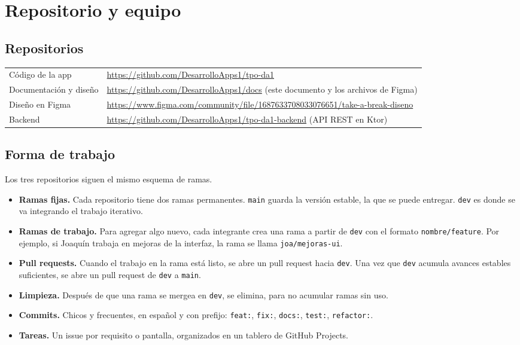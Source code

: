 \section{Repositorio y equipo}
\label{sec:equipo}

\subsection{Repositorios}

\begin{table}[H]
\centering\small
\begin{tabularx}{\textwidth}{@{}l L@{}}
\toprule
Código de la app & \url{https://github.com/DesarrolloApps1/tpo-da1} \\
Documentación y diseño & \url{https://github.com/DesarrolloApps1/docs} (este documento y los archivos de Figma) \\
Diseño en Figma & \url{https://www.figma.com/community/file/1687633708033076651/take-a-break-diseno} \\
Backend & \url{https://github.com/DesarrolloApps1/tpo-da1-backend} (API REST en Ktor) \\
\bottomrule
\end{tabularx}
\end{table}

\subsection{Forma de trabajo}

Los tres repositorios siguen el mismo esquema de ramas.

\begin{itemize}
\item \textbf{Ramas fijas.} Cada repositorio tiene dos ramas permanentes. \texttt{main} guarda la versión estable, la que se puede entregar. \texttt{dev} es donde se va integrando el trabajo iterativo.
\item \textbf{Ramas de trabajo.} Para agregar algo nuevo, cada integrante crea una rama a partir de \texttt{dev} con el formato \texttt{nombre/feature}. Por ejemplo, si Joaquín trabaja en mejoras de la interfaz, la rama se llama \texttt{joa/mejoras-ui}.
\item \textbf{Pull requests.} Cuando el trabajo en la rama está listo, se abre un pull request hacia \texttt{dev}. Una vez que \texttt{dev} acumula avances estables suficientes, se abre un pull request de \texttt{dev} a \texttt{main}.
\item \textbf{Limpieza.} Después de que una rama se mergea en \texttt{dev}, se elimina, para no acumular ramas sin uso.
\item \textbf{Commits.} Chicos y frecuentes, en español y con prefijo: \texttt{feat:}, \texttt{fix:}, \texttt{docs:}, \texttt{test:}, \texttt{refactor:}.
\item \textbf{Tareas.} Un issue por requisito o pantalla, organizados en un tablero de GitHub Projects.
\end{itemize}

